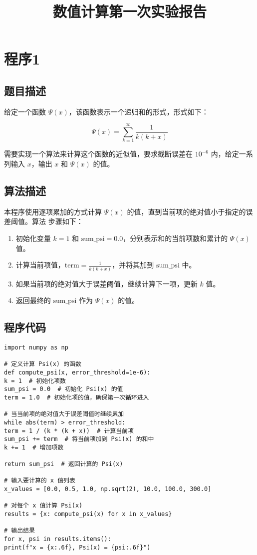 \documentclass[b5paper;twoside]{article}
\title{数值计算第一次实验报告}
\date{}
\begin{document}
\section{程序1}

\subsection{题目描述}

给定一个函数 $\Psi(x)$，该函数表示一个递归和的形式，形式如下：

\[
\Psi(x) = \sum_{k=1}^{\infty} \frac{1}{k(k + x)}
\]

需要实现一个算法来计算这个函数的近似值，要求截断误差在 $10^{-6}$ 内，给定一系列输入 
$x$，输出 $x$ 和 $\Psi(x)$ 的值。

\subsection{算法描述}

本程序使用逐项累加的方式计算 $\Psi(x)$ 的值，直到当前项的绝对值小于指定的误差阈值。算法
步骤如下：

\begin{enumerate}
	\item 初始化变量 $k=1$ 和 $\text{sum\_psi}=0.0$，分别表示和的当前项数和累计的 
	$\Psi(x)$ 值。
	\item 计算当前项值，$\text{term} = \frac{1}{k(k + x)}$，并将其加到 
	$\text{sum\_psi}$ 中。
	\item 如果当前项的绝对值大于误差阈值，继续计算下一项，更新 $k$ 值。
	\item 返回最终的 $\text{sum\_psi}$ 作为 $\Psi(x)$ 的值。
\end{enumerate}

\subsection{程序代码}

\begin{lstlisting}
import numpy as np

# 定义计算 Psi(x) 的函数
def compute_psi(x, error_threshold=1e-6):
k = 1  # 初始化项数
sum_psi = 0.0  # 初始化 Psi(x) 的值
term = 1.0  # 初始化项的值，确保第一次循环进入

# 当当前项的绝对值大于误差阈值时继续累加
while abs(term) > error_threshold:
term = 1 / (k * (k + x))  # 计算当前项
sum_psi += term  # 将当前项加到 Psi(x) 的和中
k += 1  # 增加项数

return sum_psi  # 返回计算的 Psi(x)

# 输入要计算的 x 值列表
x_values = [0.0, 0.5, 1.0, np.sqrt(2), 10.0, 100.0, 300.0]

# 对每个 x 值计算 Psi(x)
results = {x: compute_psi(x) for x in x_values}

# 输出结果
for x, psi in results.items():
print(f"x = {x:.6f}, Psi(x) = {psi:.6f}")
\end{lstlisting}
\end{document}
